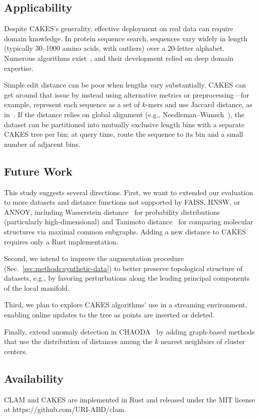 \subsection{Applicability}

Despite CAKES’s generality, effective deployment on real data can require domain knowledge. In protein sequence search, sequences vary widely in length (typically 30–1000 amino acids, with outliers) over a 20-letter alphabet. Numerous algorithms exist~\cite{kim2021entrance, daniels2013compressive, yu2015entropy, steinegger2018clustering}, and their development relied on deep domain expertise.

Simple edit distance can be poor when lengths vary substantially. CAKES can get around that issue by instead using alternative metrics or preprocessing—for example, represent each sequence as a set of $k$-mers and use Jaccard distance, as in~\cite{kim2021entrance}. If the distance relies on global alignment (e.g., Needleman–Wunsch~\cite{needleman1970general}), the dataset can be partitioned into mutually exclusive length bins with a separate CAKES tree per bin; at query time, route the sequence to its bin and a small number of adjacent bins.


\subsection{Future Work}

This study suggests several directions. First, we want to extended our evaluation to more datasets and distance functions not supported by FAISS, HNSW, or ANNOY, including Wasserstein distance~\cite{vallender1974calculation} for probability distributions (particularly high-dimensional) and Tanimoto distance~\cite{bajusz2015tanimoto} for comparing molecular structures via maximal common subgraphs. Adding a new distance to CAKES requires only a Rust implementation.

Second, we intend to improve the augmentation procedure (Sec.~\ref{sec:methods:synthetic-data}) to better preserve topological structure of datasets, e.g., by favoring perturbations along the leading principal components of the local manifold.

Third, we plan to explore CAKES algorithms' use in a streaming environment, enabling online updates to the tree as points are inserted or deleted. 

Finally, extend anomaly detection in CHAODA~\cite{ishaq2021clustered} by adding graph-based methods that use the distribution of distances among the $k$ nearest neighbors of cluster centers.

\subsection{Availability}

CLAM and CAKES are implemented in Rust and released under the MIT license at https://github.com/URI-ABD/clam.
